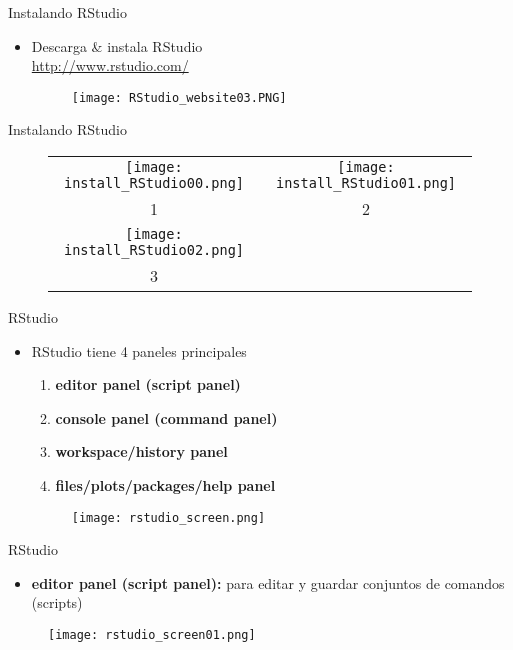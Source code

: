 \documentclass{beamer}
\begin{document}
\begin{frame}{Instalando RStudio}
\begin{itemize}
\item Descarga \& instala RStudio\\
\url{http://www.rstudio.com/}
\begin{figure}[H]
\centering
\texttt{[image: RStudio\_website03.PNG]}
\end{figure}
\end{itemize}
\end{frame}

\begin{frame}{Instalando RStudio}

\begin{figure}
\begin{tabular}{cc}
\texttt{[image: install\_RStudio00.png]} &   \texttt{[image: install\_RStudio01.png]} \\
1 & 2\\
\texttt{[image: install\_RStudio02.png]} &   \\
3 & \\
\end{tabular}
\end{figure}
\end{frame}

\begin{frame}{RStudio}
\begin{itemize}
\item RStudio tiene 4 paneles principales
\begin{enumerate}
\item \textbf{editor panel (script panel)}
\item \textbf{console panel (command panel)}
\item \textbf{workspace/history panel}
\item \textbf{files/plots/packages/help panel}
\end{enumerate}
\begin{figure}[H]
\centering
\texttt{[image: rstudio\_screen.png]}
\end{figure}
\end{itemize}
\end{frame}

\begin{frame}{RStudio}
\begin{itemize}
\item \textbf{editor panel (script panel):} para editar y guardar conjuntos de comandos (scripts)
\end{itemize}
\begin{figure}[H]
\centering
\texttt{[image: rstudio\_screen01.png]}
\end{figure}
\end{frame}
\end{document}
